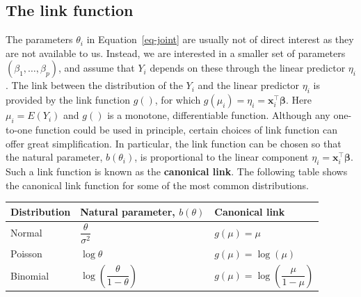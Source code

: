\documentclass[
  a4paper,
  DIV=11,
  numbers=noendperiod]{scrreprt}
\newcommand{\term}[1]{\textbf{#1}}
\begin{document}
\subsection{\texorpdfstring{The \term{link
function}}{The link function}}\label{the-link-function}

The parameters \(\theta_i\) in Equation~\ref{eq-joint} are usually not
of direct interest as they are not available to us. Instead, we are
interested in a smaller set of parameters \((\beta_1,\dots, \beta_p)\),
and assume that \(Y_i\) depends on these through the linear predictor
\(\eta_i\). The link between the distribution of the \(Y_i\) and the
linear predictor \(\eta_i\) is provided by the link function \(g()\),
for which
\(g(\mu_i)=\eta_i=\boldsymbol{x}_i^{\intercal} \boldsymbol{\beta}.\)
Here \(\mu_i=E(Y_i)\) and \(g()\) is a monotone, differentiable
function. Although any one-to-one function could be used in principle,
certain choices of link function can offer great simplification. In
particular, the link function can be chosen so that the natural
parameter, \(b(\theta_i)\), is proportional to the linear component
\(\eta_i=\boldsymbol{x}_i^{\intercal} \boldsymbol{\beta}\). Such a link
function is known as the \term{canonical link}. The following table
shows the canonical link function for some of the most common
distributions.

\begin{longtable}[]{@{}
  >{\raggedright\arraybackslash}p{}
  >{\raggedright\arraybackslash}p{}
  >{\raggedright\arraybackslash}p{}@{}}
\toprule\noalign{}
\begin{minipage}[b]{\linewidth}\raggedright
Distribution
\end{minipage} & \begin{minipage}[b]{\linewidth}\raggedright
Natural parameter, \(b(\theta)\)
\end{minipage} & \begin{minipage}[b]{\linewidth}\raggedright
Canonical link
\end{minipage} \\
\midrule\noalign{}
\endhead
\bottomrule\noalign{}
\endlastfoot
Normal & \(\dfrac{\theta}{\sigma^2}\) & \(g(\mu)=\mu\) \\
Poisson & \(\log \theta\) & \(g(\mu)=\log(\mu)\) \\
Binomial & \(\log\left(\dfrac{\theta}{1-\theta} \right)\) &
\(g(\mu)=\log\left(\dfrac{\mu}{1-\mu} \right)\) \\
\end{longtable}
\end{document}
